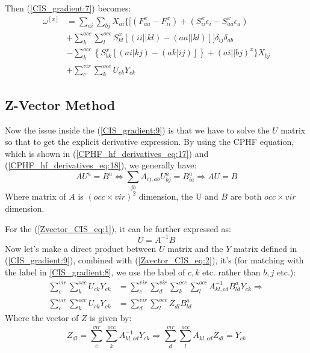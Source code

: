 Then (\ref{CIS_gradient:7}) becomes:
\begin{align}
 \label{CIS_gradient:9}
\omega^{[x]} &=  \sum_{ai}\sum_{bj}X_{ai}\Bigg\{\Big[  (F^{x}_{aa} -
F^{x}_{ii}) +
(S^{x}_{ii}\epsilon_{i} - S^{x}_{aa}\epsilon_{a})  \nonumber \\
&+\sum_{k}^{occ}\sum_{l}^{occ}S_{kl}^{x}[(ii||kl) -
(aa||kl)]\Big]\delta_{ij}\delta_{ab} \nonumber
\\ 
& -\sum_{k}^{occ}\left\{S^{x}_{bk}\left[(ai|kj)-(ak|ij)\right] \right\} +
(ai||bj)^{x} \Bigg\} X_{bj} 
\nonumber \\
&+\sum_{c}^{vir}\sum_{k}^{occ}U_{ck}Y_{ck}
\end{align}

\subsection{Z-Vector Method}
%
%
%
Now the issue inside the (\ref{CIS_gradient:9}) is that we have to solve the
$U$ matrix so that to get the explicit derivative expression. By using the CPHF
equation, which is shown in (\ref{CPHF_hf_derivatives_eq:17}) and
(\ref{CPHF_hf_derivatives_eq:18}), we generally have:
\begin{equation}
 \label{Zvector_CIS_eq:1}
AU^{a} = B^{a}\Leftrightarrow \sum_{jb}A_{ij, ab}U^{a}_{bj} =
B^{a}_{ia} \Rightarrow AU = B
\end{equation}
Where matrix of $A$ is $(occ\times vir)^{2}$ dimension, the U and $B$ are both
$occ\times vir$ dimension.

For the (\ref{Zvector_CIS_eq:1}), it can be further expressed as:
\begin{equation}
 \label{Zvector_CIS_eq:2}
U = A^{-1}B
\end{equation}
Now let's make a direct product between $U$ matrix and the $Y$ matrix defined
in (\ref{CIS_gradient:9}), combined with (\ref{Zvector_CIS_eq:2}), it's (for
matching with the label in \ref{CIS_gradient:8}, we use the label of $c,k$ etc.
rather than $b,j$ etc.):
\begin{align}
  \label{Zvector_CIS_eq:3}
\sum_{c}^{vir}\sum_{k}^{occ}U_{ck}Y_{ck} &=
\sum_{c}^{vir}\sum_{d}^{vir}\sum_{k}^{occ}\sum_{l}^{occ}A_{kl,cd}^{-1}B^{a}_{ld}
Y_{ck} \Rightarrow \nonumber \\
\sum_{c}^{vir}\sum_{k}^{occ}U_{ck}Y_{ck} &=
\sum_{d}^{vir}\sum_{l}^{occ}Z_{dl}B^{a}_{ld}
\end{align}
Where the vector of $Z$ is given by:
\begin{equation}
 \label{Zvector_CIS_eq:4}
Z_{dl} = \sum_{c}^{vir}\sum_{k}^{occ}A_{kl,cd}^{-1}Y_{ck} \Rightarrow
\sum_{d}^{vir}\sum_{l}^{occ}A_{kl,cd}Z_{dl} = Y_{ck}
\end{equation}

